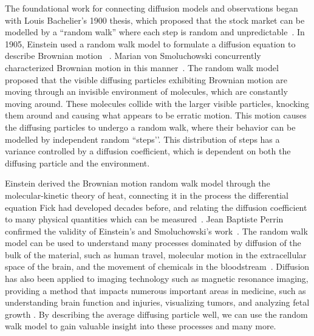 The foundational work for connecting diffusion models and observations began with Louis Bachelier's 1900 thesis, which proposed that the stock market can be modelled by a ``random walk'' where each step is random and unpredictable~\cite{bachelier_theorie_1900}. In 1905, Einstein used a random walk model to formulate a diffusion equation to describe Brownian motion ~\cite{einstein_uber_1905}. Marian von Smoluchowski concurrently characterized Brownian motion in this manner~\cite{von_smoluchowski_zur_1906}. The random walk model proposed that the visible diffusing particles exhibiting Brownian motion are moving through an invisible environment of molecules, which are constantly moving around. These molecules collide with the larger visible particles, knocking them around and causing what appears to be erratic motion. This motion causes the diffusing particles to undergo a random walk, where their behavior can be modelled by independent random ``steps’’. This distribution of steps has a variance controlled by a diffusion coefficient, which is dependent on both the diffusing particle and the environment.

Einstein derived the Brownian motion random walk model through the molecular-kinetic theory of heat, connecting it in the process the differential equation Fick had developed decades before, and relating the diffusion coefficient to many physical quantities which can be measured~\cite{einstein_uber_1905}. Jean Baptiste Perrin confirmed the validity of Einstein's and Smoluchowski's work~\cite{perrin_mouvement_1909}. The random walk model can be used to understand many processes dominated by diffusion of the bulk of the material, such as human travel, molecular motion in the extracellular space of the brain, and the movement of chemicals in the bloodstream~\cite{gonzalez_understanding_2008, nicholson_extracellular_1998, ursino_mathematical_1989, zhang_lattice_2019}. Diffusion has also been applied to imaging technology such as magnetic resonance imaging, providing a method that impacts numerous important areas in medicine, such as understanding brain function and injuries, visualizing tumors, and analyzing fetal growth \cite{le_bihan_mr_1986, le_bihan_diffusion_2014, wijman_prognostic_2009, low_diffusion-weighted_2007, han_assessment_2015, abdel_razek_apparent_2019}. By describing the average diffusing particle well, we can use the random walk model to gain valuable insight into these processes and many more.

